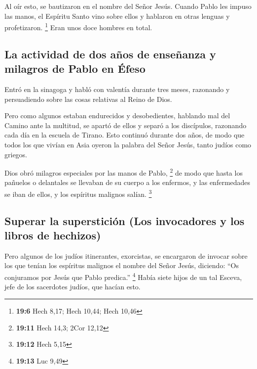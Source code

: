 \begin{paracol}{2}
 Al oír esto, se bautizaron en el nombre del Señor Jesús.
 Cuando Pablo les impuso las manos, el Espíritu Santo vino
sobre ellos y hablaron en otras lenguas y profetizaron. \footnote{\textbf{19:6}
  Hech 8,17; Hech 10,44; Hech 10,46}  Eran unos doce
hombres en total.

\hypertarget{la-actividad-de-dos-auxf1os-de-enseuxf1anza-y-milagros-de-pablo-en-uxe9feso}{%
\subsection{La actividad de dos años de enseñanza y milagros de Pablo en
Éfeso}\label{la-actividad-de-dos-auxf1os-de-enseuxf1anza-y-milagros-de-pablo-en-uxe9feso}}

 Entró en la sinagoga y habló con valentía durante tres
meses, razonando y persuadiendo sobre las cosas relativas al Reino de
Dios.

 Pero como algunos estaban endurecidos y desobedientes,
hablando mal del Camino ante la multitud, se apartó de ellos y separó a
los discípulos, razonando cada día en la escuela de Tirano.
 Esto continuó durante dos años, de modo que todos los
que vivían en Asia oyeron la palabra del Señor Jesús, tanto judíos como
griegos.

 Dios obró milagros especiales por las manos de Pablo,
\footnote{\textbf{19:11} Hech 14,3; 2Cor 12,12}  de modo
que hasta los pañuelos o delantales se llevaban de su cuerpo a los
enfermos, y las enfermedades se iban de ellos, y los espíritus malignos
salían. \footnote{\textbf{19:12} Hech 5,15}

\hypertarget{superar-la-supersticiuxf3n-los-invocadores-y-los-libros-de-hechizos}{%
\subsection{Superar la superstición (Los invocadores y los libros de
hechizos)}\label{superar-la-supersticiuxf3n-los-invocadores-y-los-libros-de-hechizos}}

 Pero algunos de los judíos itinerantes, exorcistas, se
encargaron de invocar sobre los que tenían los espíritus malignos el
nombre del Señor Jesús, diciendo: ``Os conjuramos por Jesús que Pablo
predica.'' \footnote{\textbf{19:13} Luc 9,49}  Había
siete hijos de un tal Esceva, jefe de los sacerdotes judíos, que hacían
esto.


\end{paracol}
